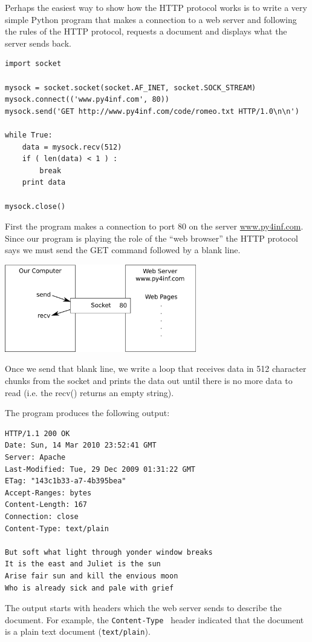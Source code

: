 \documentclass[11pt]{book}
\begin{document}
Perhaps the easiest way to show how the HTTP protocol works is to write a very 
simple Python program that makes a connection to a web server and following
the rules of the HTTP protocol, requests a document 
and displays what the server sends back.

\beforeverb
\begin{verbatim}
import socket

mysock = socket.socket(socket.AF_INET, socket.SOCK_STREAM)
mysock.connect(('www.py4inf.com', 80))
mysock.send('GET http://www.py4inf.com/code/romeo.txt HTTP/1.0\n\n')

while True:
    data = mysock.recv(512)
    if ( len(data) < 1 ) :
        break
    print data

mysock.close()
\end{verbatim}
\afterverb
%
First the program makes a connection to port 80 on 
the server \url{www.py4inf.com}.
Since our program is playing the role of the ``web browser'' the HTTP
protocol says we must send the GET command followed by a blank line.

\beforefig
\centerline{\includegraphics[height=1.50in]{figs2/socket.eps}}
\afterfig

Once we send that blank line, we write a loop that receives data 
in 512 character chunks from the socket and prints the data out 
until there is no more data to read (i.e. the recv() returns 
an empty string).

The program produces the following output:

\beforeverb
\begin{verbatim}
HTTP/1.1 200 OK
Date: Sun, 14 Mar 2010 23:52:41 GMT
Server: Apache
Last-Modified: Tue, 29 Dec 2009 01:31:22 GMT
ETag: "143c1b33-a7-4b395bea"
Accept-Ranges: bytes
Content-Length: 167
Connection: close
Content-Type: text/plain

But soft what light through yonder window breaks
It is the east and Juliet is the sun
Arise fair sun and kill the envious moon
Who is already sick and pale with grief
\end{verbatim}
\afterverb
%
The output starts with headers which the web server sends
to describe the document.
For example, the {\tt Content-Type } header indicated that
the document is a plain text document ({\tt text/plain}).
\end{document}
